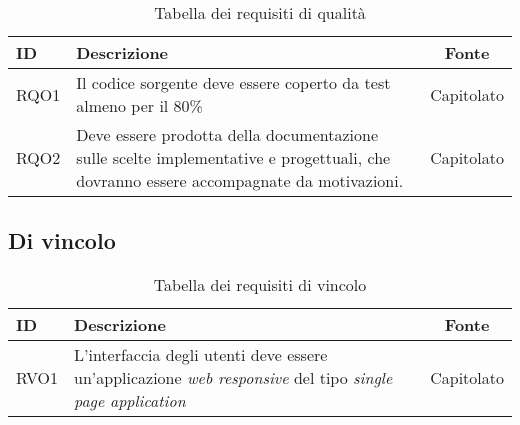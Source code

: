 \begin{table}[H]
	\renewcommand{\arraystretch}{1.5}
	\centering
	\begin{tabularx}{\textwidth}{l|X|c}
		\textbf{ID} & \textbf{Descrizione}                                                                                                                  & \textbf{Fonte} \\
		\hline
		RQO1        & Il codice sorgente deve essere coperto da test almeno per il 80\%                                                                     & Capitolato     \\
		\hline
		RQO2        & Deve essere prodotta della documentazione sulle scelte implementative e progettuali, che dovranno essere accompagnate da motivazioni. & Capitolato     \\
		\hline
	\end{tabularx}
	\caption{Tabella dei requisiti di qualità}
\end{table}

\subsection{Di vincolo}

\begin{table}[H]
	\renewcommand{\arraystretch}{1.5}
	\centering
	\begin{tabularx}{\textwidth}{l|X|c}
		\textbf{ID} & \textbf{Descrizione}                                                                                   & \textbf{Fonte} \\
		\hline
		RVO1        & L'interfaccia degli utenti deve essere un'applicazione \textit{web responsive} del tipo \textit{single page application} & Capitolato     \\
		\hline
	\end{tabularx}
	\caption{Tabella dei requisiti di vincolo}
\end{table}

